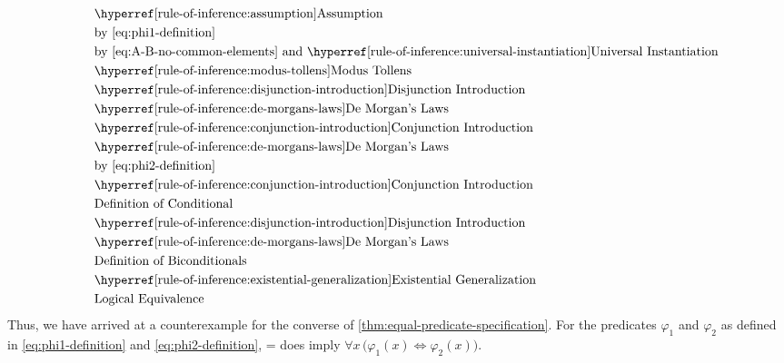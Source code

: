 \begin{rem}
\begin{equation*}
\begin{aligned}
        \end{aligned}
        \text{  }
        \begin{aligned}
            &\quad\text{\aref{rule-of-inference:assumption}{Assumption}} \\
            &\quad\text{by \eqref{eq:phi1-definition}} \\
            &\quad\text{by \eqref{eq:A-B-no-common-elements} and \aref{rule-of-inference:universal-instantiation}{Universal Instantiation}} \\
            &\quad\text{\aref{rule-of-inference:modus-tollens}{Modus Tollens}} \\
            &\quad\text{\aref{rule-of-inference:disjunction-introduction}{Disjunction Introduction}} \\
            &\quad\text{\aref{rule-of-inference:de-morgans-laws}{De Morgan's Laws}} \\
            &\quad\text{\aref{rule-of-inference:conjunction-introduction}{Conjunction Introduction}} \\
            &\quad\text{\aref{rule-of-inference:de-morgans-laws}{De Morgan's Laws}} \\
            &\quad\text{by \eqref{eq:phi2-definition}} \\
            &\quad\text{\aref{rule-of-inference:conjunction-introduction}{Conjunction Introduction}} \\
            &\quad\text{Definition of Conditional} \\
            &\quad\text{\aref{rule-of-inference:disjunction-introduction}{Disjunction Introduction}} \\
            &\quad\text{\aref{rule-of-inference:de-morgans-laws}{De Morgan's Laws}} \\
            &\quad\text{Definition of Biconditionals} \\
            &\quad\text{\aref{rule-of-inference:existential-generalization}{Existential Generalization}} \\
            &\quad\text{Logical Equivalence}
        \end{aligned}
    \end{equation*}
    Thus, we have arrived at a counterexample for the converse of \cref{thm:equal-predicate-specification}.
    For the predicates \( \varphi_{1} \) and \( \varphi_{2} \) as defined in \eqref{eq:phi1-definition} and
    \eqref{eq:phi2-definition},  = 
    does  imply \( \forall x \, \big( \varphi_{1}(x) \iff \varphi_{2}(x) \big) \).
\end{rem}

